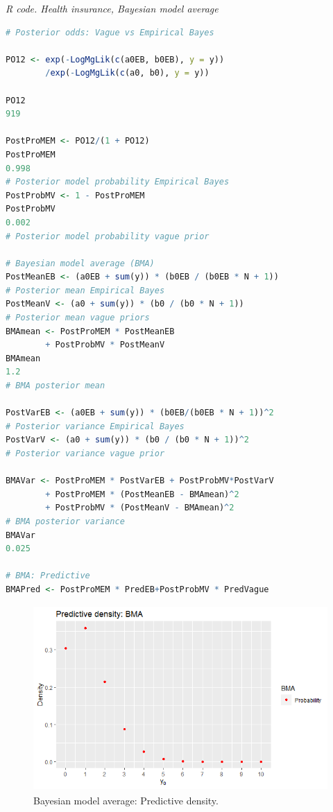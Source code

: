 \begin{tcolorbox}[enhanced,width=4.67in,center upper,
	fontupper=\large\bfseries,drop shadow southwest,sharp corners]
\textit{R code. Health insurance, Bayesian model average}
\begin{VF}
\begin{lstlisting}[basicstyle=\footnotesize, language=R]
# Posterior odds: Vague vs Empirical Bayes

PO12 <- exp(-LogMgLik(c(a0EB, b0EB), y = y))
		/exp(-LogMgLik(c(a0, b0), y = y))

PO12
919

PostProMEM <- PO12/(1 + PO12) 
PostProMEM
0.998
# Posterior model probability Empirical Bayes
PostProbMV <- 1 - PostProMEM 
PostProbMV
0.002
# Posterior model probability vague prior

# Bayesian model average (BMA)
PostMeanEB <- (a0EB + sum(y)) * (b0EB / (b0EB * N + 1)) 
# Posterior mean Empirical Bayes 
PostMeanV <- (a0 + sum(y)) * (b0 / (b0 * N + 1)) 
# Posterior mean vague priors
BMAmean <- PostProMEM * PostMeanEB 
		+ PostProbMV * PostMeanV  
BMAmean
1.2
# BMA posterior mean

PostVarEB <- (a0EB + sum(y)) * (b0EB/(b0EB * N + 1))^2 
# Posterior variance Empirical Bayes
PostVarV <- (a0 + sum(y)) * (b0 / (b0 * N + 1))^2 
# Posterior variance vague prior 

BMAVar <- PostProMEM * PostVarEB + PostProbMV*PostVarV 
		+ PostProMEM * (PostMeanEB - BMAmean)^2 
		+ PostProbMV * (PostMeanV - BMAmean)^2
# BMA posterior variance   
BMAVar
0.025

# BMA: Predictive
BMAPred <- PostProMEM * PredEB+PostProbMV * PredVague    
\end{lstlisting}
\end{VF}
\end{tcolorbox}

\begin{figure}[!h]
	\includegraphics[width=340pt, height=200pt]{Chapters/chapter1/figures/BMA.png}
	\caption[List of figure caption goes here]{Bayesian model average: Predictive density.}\label{fig15}
\end{figure}

